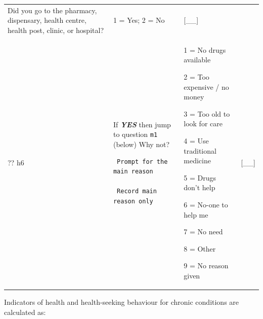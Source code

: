 \documentclass[12pt,a4paper]{book}
\theoremstyle{definition}
\theoremstyle{definition}
\theoremstyle{definition}
\theoremstyle{remark}
\begin{document}
\begin{longtable}[]{@{}llll@{}}
\begin{minipage}[t]{0.41\columnwidth}
Did you go to the pharmacy, dispensary, health centre, health post,
clinic, or hospital?\strut
\end{minipage} & \begin{minipage}[t]{0.25\columnwidth}\raggedright
1 = Yes; 2 = No\strut
\end{minipage} & \begin{minipage}[t]{0.13\columnwidth}\raggedright
{[}\_\_{]}\strut
\end{minipage}\tabularnewline
\begin{minipage}[t]{0.24\columnwidth}\raggedright
?? h6\strut
\end{minipage} & \begin{minipage}[t]{0.24\columnwidth}\raggedright
If \textbf{\emph{YES}} then jump to question \texttt{m1} (below) Why
not?

\begin{verbatim}
 Prompt for the main reason

 Record main reason only
\end{verbatim}
\strut
\end{minipage} & \begin{minipage}[t]{0.24\columnwidth}\raggedright
1 = No drugs available

2 = Too expensive / no money

3 = Too old to look for care

4 = Use traditional medicine

5 = Drugs don't help

6 = No-one to help me

7 = No need

8 = Other

9 = No reason given\strut
\end{minipage} & \begin{minipage}[t]{0.24\columnwidth}\raggedright
{[}\_\_{]}\strut
\end{minipage}\tabularnewline
\bottomrule
\end{longtable}

Indicators of health and health-seeking behaviour for chronic conditions
are calculated as:
\end{document}
